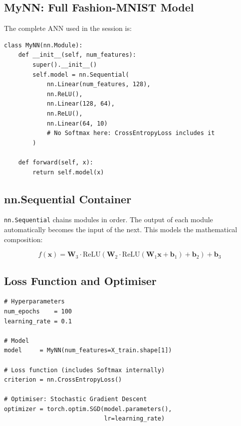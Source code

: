 \documentclass[12pt,a4paper]{article}
\begin{document}
\subsection{MyNN: Full Fashion-MNIST Model}
\label{subsec:mynn}

The complete ANN used in the session is:

\begin{tcolorbox}[colback=gray!5!white, colframe=gray!60!black,
  fonttitle=\bfseries, title=Listing 4: MyNN -- Fashion-MNIST ANN]
\begin{verbatim}
class MyNN(nn.Module):
    def __init__(self, num_features):
        super().__init__()
        self.model = nn.Sequential(
            nn.Linear(num_features, 128),
            nn.ReLU(),
            nn.Linear(128, 64),
            nn.ReLU(),
            nn.Linear(64, 10)
            # No Softmax here: CrossEntropyLoss includes it
        )

    def forward(self, x):
        return self.model(x)
\end{verbatim}
\end{tcolorbox}

\subsection{nn.Sequential Container}
\label{subsec:sequential}

\texttt{nn.Sequential} chains modules in order.  The output of each module
automatically becomes the input of the next.  This models the mathematical
composition:

\begin{equation}
  f(\mathbf{x}) = \mathbf{W}_3 \cdot
    \text{ReLU}\!\left(\mathbf{W}_2 \cdot
      \text{ReLU}\!\left(\mathbf{W}_1 \mathbf{x} + \mathbf{b}_1\right)
      + \mathbf{b}_2\right)
    + \mathbf{b}_3
  \label{eq:sequential}
\end{equation}

\subsection{Loss Function and Optimiser}
\label{subsec:loss}

\begin{tcolorbox}[colback=gray!5!white, colframe=gray!60!black,
  fonttitle=\bfseries, title=Listing 5: Instantiating model, loss, and optimiser]
\begin{verbatim}
# Hyperparameters
num_epochs    = 100
learning_rate = 0.1

# Model
model     = MyNN(num_features=X_train.shape[1])

# Loss function (includes Softmax internally)
criterion = nn.CrossEntropyLoss()

# Optimiser: Stochastic Gradient Descent
optimizer = torch.optim.SGD(model.parameters(),
                            lr=learning_rate)
\end{verbatim}
\end{tcolorbox}
\end{document}
